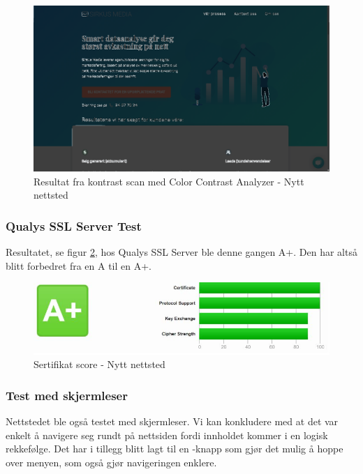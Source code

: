 \begin{figure}[H]
    \centering
    \includegraphics[width=\textwidth]{bjornar/contrast-new.png}
    \caption{Resultat fra kontrast scan med Color Contrast Analyzer - Nytt nettsted}
    \label{fig:analysis-new-contrast}
\end{figure}

\subsubsection{Qualys SSL Server Test}
Resultatet, se figur \ref{fig:analysis-new-ssl-test}, hos Qualys SSL Server ble denne gangen A+. Den har altså blitt forbedret fra en A til en A+.

\begin{figure}[H]
    \centering
    \includegraphics[width=\textwidth]{bereket/QSST-test.png}
    \caption{Sertifikat score - Nytt nettsted}
    \label{fig:analysis-new-ssl-test}
\end{figure}

\subsubsection{Test med skjermleser}
Nettstedet ble også testet med skjermleser. Vi kan konkludere med at det var enkelt å navigere seg rundt på nettsiden fordi innholdet kommer i en logisk rekkefølge. Det har i tillegg blitt lagt til en -knapp som gjør det mulig å hoppe over menyen, som også gjør navigeringen enklere.

